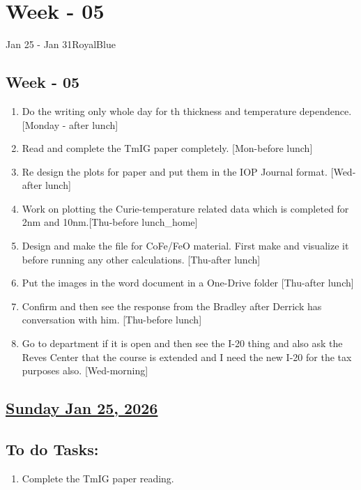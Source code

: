 \section{Week - 05}
\begin{physicsmodule}{Jan 25 - Jan 31}{RoyalBlue}
  \begin{lawbox}
    \subsection*{\sffamily\bfseries Week - 05}
    \begin{enumerate}
    \item Do the writing only whole day for th thickness and temperature dependence. [Monday - after lunch] \cmark
    \item Read and complete the TmIG paper completely. [Mon-before lunch] \cmark
    \item Re design the plots for paper and put them in the IOP Journal format. [Wed-after lunch] \cmark
    \item Work on plotting the Curie-temperature related data which is completed for 2nm and 10nm.[Thu-before lunch\_home]
     \item Design and make the file for CoFe/FeO material. First make and visualize it before running any other calculations. [Thu-after lunch]
     \item Put the images in the word document in a One-Drive folder [Thu-after lunch]
     \item Confirm and then see the response from the Bradley after Derrick has conversation with him. [Thu-before lunch]
     \item Go to department if it is open and then see the I-20 thing and also ask the Reves Center that the course is extended and I need the new I-20 for the tax purposes also. [Wed-morning]\cmark
\end{enumerate}
  \end{lawbox}
\end{physicsmodule}
\subsection*{\underline{Sunday Jan 25, 2026}}
\subsection*{To do Tasks:}
\begin{enumerate}
    \item Complete the TmIG paper reading.  \cmark
\end{enumerate}

